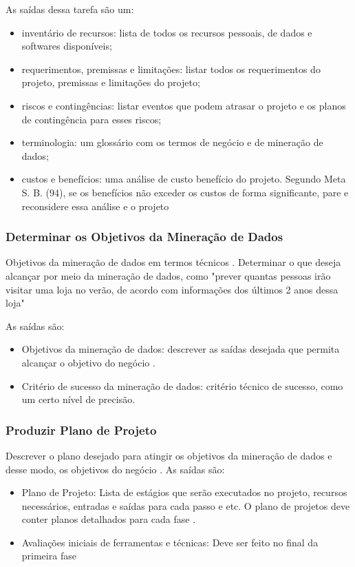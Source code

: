 As saídas dessa tarefa são um:
\begin{itemize}
    \item inventário de recursos: lista de todos os recursos pessoais, de dados e softwares disponíveis;
    \item requerimentos, premissas e limitações: listar todos os requerimentos do projeto, premissas e limitações do projeto;
    \item riscos e contingências: listar eventos que podem atrasar o projeto e os planos de contingência para esses riscos;
    \item terminologia: um glossário com os termos de negócio e de mineração de dados;
    \item custos e benefícios: uma análise de custo benefício do projeto. Segundo Meta S. B. (94), se os benefícios não exceder os custos de forma significante, pare e reconsidere essa análise e o projeto
\end{itemize}

\subsubsection{Determinar os Objetivos da Mineração de Dados}
Objetivos da mineração de dados em termos técnicos \citep[16]{crispmanual}. Determinar o que deseja alcançar por meio da mineração de dados, como "prever quantas pessoas irão visitar uma loja no verão, de acordo com informações dos últimos 2 anos dessa loja"

As saídas são:
\begin{itemize}
    \item Objetivos da mineração de dados: descrever as saídas desejada que permita alcançar o objetivo do negócio \citep[17]{crispmanual}.
    \item Critério de sucesso da mineração de dados: critério técnico de sucesso, como um certo nível de precisão.
\end{itemize}

\subsubsection{Produzir Plano de Projeto}
Descrever o plano desejado para atingir os objetivos da mineração de dados e desse modo, os objetivos do negócio \citep[17]{crispmanual}.
As saídas são: 
\begin{itemize}
    \item Plano de Projeto: Lista de estágios que serão executados no projeto, recursos necessários, entradas e saídas para cada passo e etc. O plano de projetos deve conter planos detalhados para cada fase \citep[17]{crispmanual}.
    \item Avaliações iniciais de ferramentas e técnicas: Deve ser feito no final da primeira fase
\end{itemize}

